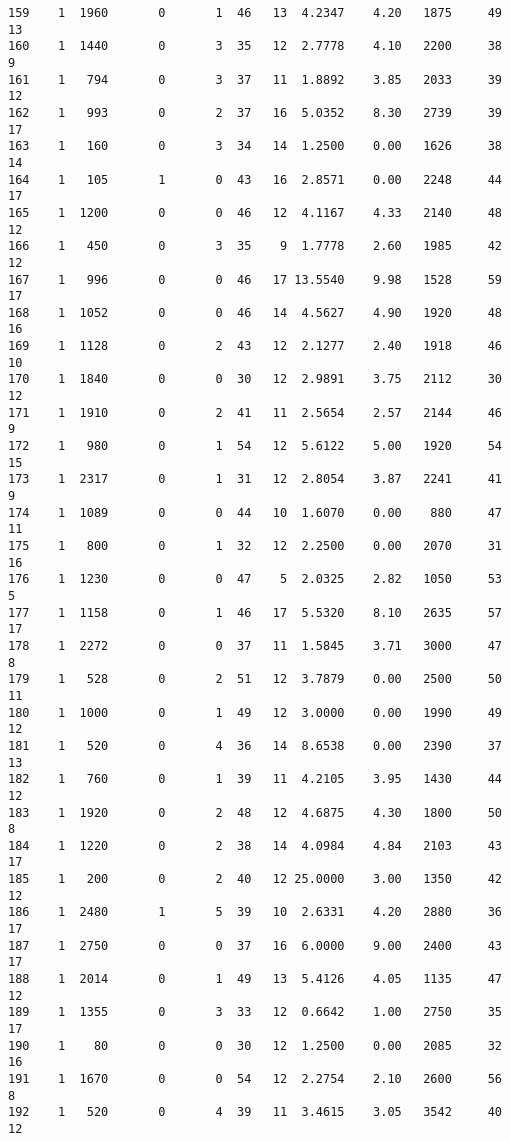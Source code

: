 \documentclass[
  letterpaper,
  DIV=11,
  numbers=noendperiod]{scrreprt}
\begin{document}
\begin{verbatim}
159    1  1960       0       1  46   13  4.2347    4.20   1875     49      13
160    1  1440       0       3  35   12  2.7778    4.10   2200     38       9
161    1   794       0       3  37   11  1.8892    3.85   2033     39      12
162    1   993       0       2  37   16  5.0352    8.30   2739     39      17
163    1   160       0       3  34   14  1.2500    0.00   1626     38      14
164    1   105       1       0  43   16  2.8571    0.00   2248     44      17
165    1  1200       0       0  46   12  4.1167    4.33   2140     48      12
166    1   450       0       3  35    9  1.7778    2.60   1985     42      12
167    1   996       0       0  46   17 13.5540    9.98   1528     59      17
168    1  1052       0       0  46   14  4.5627    4.90   1920     48      16
169    1  1128       0       2  43   12  2.1277    2.40   1918     46      10
170    1  1840       0       0  30   12  2.9891    3.75   2112     30      12
171    1  1910       0       2  41   11  2.5654    2.57   2144     46       9
172    1   980       0       1  54   12  5.6122    5.00   1920     54      15
173    1  2317       0       1  31   12  2.8054    3.87   2241     41       9
174    1  1089       0       0  44   10  1.6070    0.00    880     47      11
175    1   800       0       1  32   12  2.2500    0.00   2070     31      16
176    1  1230       0       0  47    5  2.0325    2.82   1050     53       5
177    1  1158       0       1  46   17  5.5320    8.10   2635     57      17
178    1  2272       0       0  37   11  1.5845    3.71   3000     47       8
179    1   528       0       2  51   12  3.7879    0.00   2500     50      11
180    1  1000       0       1  49   12  3.0000    0.00   1990     49      12
181    1   520       0       4  36   14  8.6538    0.00   2390     37      13
182    1   760       0       1  39   11  4.2105    3.95   1430     44      12
183    1  1920       0       2  48   12  4.6875    4.30   1800     50       8
184    1  1220       0       2  38   14  4.0984    4.84   2103     43      17
185    1   200       0       2  40   12 25.0000    3.00   1350     42      12
186    1  2480       1       5  39   10  2.6331    4.20   2880     36      17
187    1  2750       0       0  37   16  6.0000    9.00   2400     43      17
188    1  2014       0       1  49   13  5.4126    4.05   1135     47      12
189    1  1355       0       3  33   12  0.6642    1.00   2750     35      17
190    1    80       0       0  30   12  1.2500    0.00   2085     32      16
191    1  1670       0       0  54   12  2.2754    2.10   2600     56       8
192    1   520       0       4  39   11  3.4615    3.05   3542     40      12

\end{verbatim}
\end{document}
